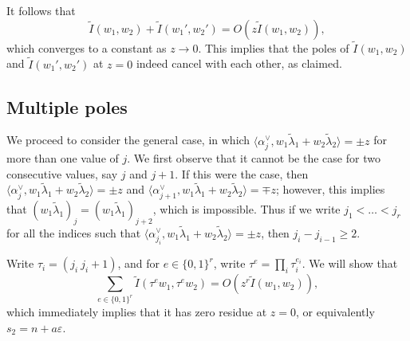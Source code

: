 \documentclass[11pt]{amsart}
\numberwithin{theorem}{section}
\numberwithin{equation}{section}
\theoremstyle{remark}
\theoremstyle{definition}
\begin{document}
It follows that
\begin{equation*}
\tilde I(w_1,w_2) + \tilde I(w_1',w_2') = O(z\tilde I(w_1,w_2)),
\end{equation*}
which converges to a constant as $z \rightarrow 0$. This implies that the poles of $\tilde I(w_1,w_2)$ and $\tilde I(w_1',w_2')$ at $z=0$ indeed cancel with each other, as claimed.

\subsection{Multiple poles}

We proceed to consider the general case, in which $\langle \alpha_j^\vee,w_1\tilde\lambda_1+w_2\tilde\lambda_2\rangle = \pm z$ for more than one value of $j$. We first observe that it cannot be the case for two consecutive values, say $j$ and $j+1$. If this were the case, then $\langle \alpha^\vee_j,w_1\tilde\lambda_1+w_2\tilde\lambda_2\rangle = \pm z$ and $\langle \alpha^\vee_{j+1},w_1\tilde\lambda_1+w_2\tilde\lambda_2\rangle =\mp z$; however, this implies that $(w_1\tilde\lambda_1)_j=(w_1\tilde\lambda_1)_{j+2}$, which is impossible. Thus if we write $j_1 < \ldots < j_r$ for all the indices such that $\langle \alpha_{j_i}^\vee,w_1\tilde\lambda_1+w_2\tilde\lambda_2\rangle = \pm z$, then $j_{i}-j_{i-1} \geq 2$.

Write $\tau_i = (j_i \ j_i+1)$, and for $e \in \{0,1\}^r$, write $\tau^e = \prod_i \tau_i^{e_i}$. We will show that 
\begin{equation*}
\sum_{e \in \{0,1\}^r} \tilde I(\tau^{e}w_1,\tau^{e}w_2) = O(z^r\tilde I(w_1,w_2)),
\end{equation*}
which immediately implies that it has zero residue at $z=0$, or equivalently $s_2=n+a\varepsilon$.
\end{document}
